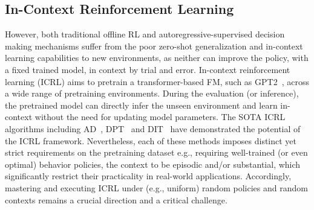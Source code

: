 \subsection{In-Context Reinforcement Learning}
%
However, both traditional offline RL and autoregressive-supervised decision making mechanisms suffer from the poor zero-shot generalization and in-context learning capabilities to new environments, as neither can improve the policy, with a fixed trained model, in context by trial and error. In-context reinforcement learning (ICRL) aims to pretrain a transformer-based FM, such as GPT2~\citep{radford2019language}, across a wide range of pretraining environments. During the evaluation (or inference), the pretrained model can directly infer the unseen environment and learn in-context without the need for updating model parameters. 
%
%
The SOTA ICRL algorithms including AD~\citep{laskin2022context}, DPT~\citep{lee2024supervised} and DIT~\citep{dong2024context} have demonstrated the potential of the ICRL framework. Nevertheless, each of these methods imposes distinct yet strict requirements on the pretraining dataset e.g., requiring well-trained (or even optimal) behavior policies, the context to be episodic and/or substantial, which significantly restrict their practicality in real-world applications.
%
Accordingly, mastering and executing ICRL under (e.g., uniform) random policies and random contexts remains a crucial direction and a critical challenge.





